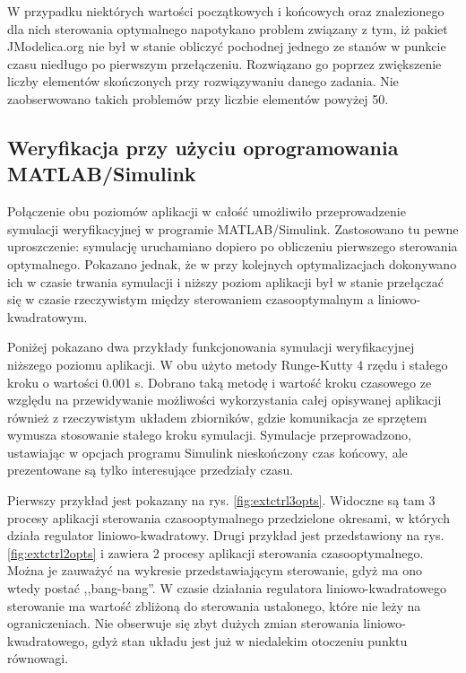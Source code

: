 W przypadku niektórych wartości początkowych i końcowych oraz znalezionego dla nich sterowania optymalnego napotykano problem związany z tym, iż pakiet JModelica.org nie był w stanie obliczyć pochodnej jednego ze stanów w punkcie czasu niedługo po pierwszym przełączeniu. Rozwiązano go poprzez zwiększenie liczby elementów skończonych przy rozwiązywaniu danego zadania. Nie zaobserwowano takich problemów przy liczbie elementów powyżej 50.

\subsection{Weryfikacja przy użyciu oprogramowania MATLAB/Simulink}
\label{sub:sym-wer-matlab}

Połączenie obu poziomów aplikacji w całość umożliwiło przeprowadzenie symulacji weryfikacyjnej w programie MATLAB/Simulink.
Zastosowano tu pewne uproszczenie: symulację uruchamiano dopiero po obliczeniu pierwszego sterowania optymalnego. Pokazano jednak, że w przy kolejnych optymalizacjach dokonywano ich w czasie trwania symulacji i niższy poziom aplikacji był w stanie przełączać się w czasie rzeczywistym między sterowaniem czasooptymalnym a liniowo-kwadratowym.

Poniżej pokazano dwa przykłady funkcjonowania symulacji weryfikacyjnej niższego poziomu aplikacji.
W obu użyto metody Runge-Kutty 4 rzędu i stałego kroku o wartości 0.001 s. Dobrano taką metodę i wartość kroku czasowego ze względu na przewidywanie możliwości wykorzystania całej opisywanej aplikacji również z rzeczywistym układem zbiorników, gdzie komunikacja ze sprzętem wymusza stosowanie stałego kroku symulacji.
Symulacje przeprowadzono, ustawiając w opcjach programu Simulink nieskończony czas końcowy, ale prezentowane są tylko interesujące przedziały czasu.

Pierwszy przykład jest pokazany na rys. \ref{fig:extctrl3opts}. Widoczne są tam 3 procesy aplikacji sterowania czasooptymalnego przedzielone okresami, w których działa regulator liniowo-kwadratowy.
Drugi przykład jest przedstawiony na rys. \ref{fig:extctrl2opts} i zawiera 2 procesy aplikacji sterowania czasooptymalnego.
Można je zauważyć na wykresie przedstawiającym sterowanie, gdyż ma ono wtedy postać ,,bang-bang''. W czasie działania regulatora liniowo-kwadratowego sterowanie ma wartość zbliżoną do sterowania ustalonego, które nie leży na ograniczeniach. Nie obserwuje się zbyt dużych zmian sterowania liniowo-kwadratowego, gdyż stan układu jest już w niedalekim otoczeniu punktu równowagi.

